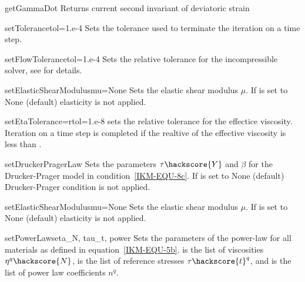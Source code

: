 \begin{methoddesc}[IncompressibleIsotropicFlowCartesian]{getGammaDot}{}
Returns current second invariant of deviatoric strain
\end{methoddesc}


\begin{methoddesc}[IncompressibleIsotropicFlowCartesian]{setTolerance}{tol=1.e-4}
Sets the tolerance used to terminate the iteration on a time step.
\end{methoddesc}

\begin{methoddesc}[IncompressibleIsotropicFlowCartesian]{setFlowTolerance}{tol=1.e-4}
Sets the relative tolerance for the incompressible solver, see  for details.
\end{methoddesc}

\begin{methoddesc}[IncompressibleIsotropicFlowCartesian]{setElasticShearModulus}{mu=None}
Sets the elastic shear modulus $\mu$. If  is set to None (default) elasticity is not applied.
\end{methoddesc}

\begin{methoddesc}[IncompressibleIsotropicFlowCartesian]{setEtaTolerance=}{rtol=1.e-8}
sets the relative tolerance for the effectice viscosity. Iteration on a time step is completed if the realtive of the effective viscosity is less than .
\end{methoddesc}

\begin{methoddesc}[IncompressibleIsotropicFlowCartesian]{setDruckerPragerLaw}
{}
Sets the parameters $\tau\hackscore{Y}$ and $\beta$ for the Drucker-Prager model in condition~\ref{IKM-EQU-8c}. If  is set to None (default) Drucker-Prager
condition is not applied.
\end{methoddesc}

\begin{methoddesc}[IncompressibleIsotropicFlowCartesian]{setElasticShearModulus}{mu=None}
Sets the elastic shear modulus $\mu$. If  is set to None (default) elasticity is not applied.
\end{methoddesc}


\begin{methoddesc}[IncompressibleIsotropicFlowCartesian]{setPowerLaws}{eta_N, tau_t, power}
Sets the parameters of the power-law for all materials as defined in 
equation~\ref{IKM-EQU-5b}.
 is the list of viscosities $\eta^{q}\hackscore{N}$,
 is the list of reference stresses  $\tau\hackscore{t}^q$,
and  is the list of  power law coefficients $n^{q}$.
\end{methoddesc}


